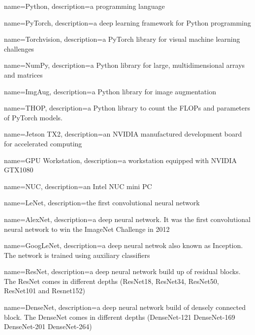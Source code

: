 {
	name=Python,
	description={a programming language}
}

{
	name=PyTorch,
	description={a deep learning framework for Python programming}
}

{
	name={Torchvision},
	description={a PyTorch library for visual machine learning challenges}
}

{
	name={NumPy},
	description={a Python library for large, multidimensional arrays and matrices}
}


{
	name={ImgAug},
	description={a Python library for image augmentation}
}

{
	name={THOP},
	description={a Python library to count the FLOPs and parameters of PyTorch models.}
}

{
	name=Jetson TX2,
	description={an NVIDIA manufactured development board for accelerated computing}
}

{
	name={GPU Workstation},
	description={a workstation equipped with NVIDIA GTX1080}
}

{
	name={NUC},
	description={an Intel NUC mini PC}
}



{
	name={LeNet},
	description={the first convolutional neural network}
}

{
	name={AlexNet},
	description={a deep neural network. It was the first convolutional neural network to win the ImageNet Challenge in 2012}
}

{
	name={GoogLeNet},
	description={a deep neural netwok also known as Inception. The network is trained using auxiliary classifiers}
}

{
	name={ResNet},
	description={a deep neural network build up of residual blocks. The ResNet comes in different depths (ResNet18, ResNet34, ResNet50, ResNet101 and Resnet152)}
}

{
	name={DenseNet},
	description={a deep neural network build of densely connected block. The DenseNet comes in different depths (DenseNet-121 DenseNet-169 DenseNet-201 DenseNet-264)}
}

